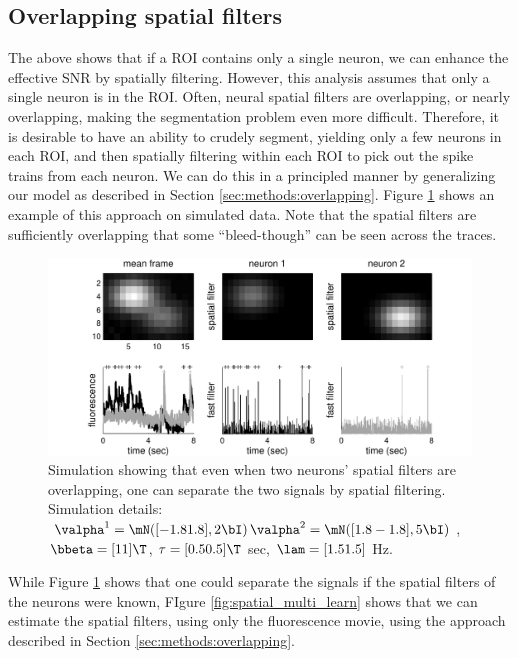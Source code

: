 \subsection{Overlapping spatial filters}


The above shows that if a ROI contains only a single neuron, we can enhance the effective SNR by spatially filtering.  However, this analysis assumes that only a single neuron is in the ROI.  Often, neural spatial filters are overlapping, or nearly overlapping, making the segmentation problem even more difficult.  Therefore, it is desirable to have an ability to crudely segment, yielding only a few neurons in each ROI, and then spatially filtering within each ROI to pick out the spike trains from each neuron.  We can do this in a principled manner by generalizing our model as described in Section \ref{sec:methods:overlapping}.  Figure \ref{fig:spatial_multi_inf} shows an example of this approach on simulated data. Note that the spatial filters are sufficiently overlapping that some ``bleed-though'' can be seen across the traces.  


\begin{figure}[h!]
\centering \includegraphics[width=.9\linewidth]{../figs/spatial_multi_inf}
\caption{Simulation showing that even when two neurons' spatial filters are overlapping, one can separate the two signals by spatial filtering. Simulation details: $\valpha^1=\mN([-1.8 1.8],2 \bI)\, \valpha^2=\mN([1.8 -1.8],5 \bI)$, $\bbeta=[1 1]\T$, $\tau=[0.5 0.5]\T$ sec, $\lam=[1.5 1.5]$ Hz.} \label{fig:spatial_multi_inf}
\end{figure}

While Figure \ref{fig:spatial_multi_inf} shows that one could separate the signals if the spatial filters of the neurons were known, FIgure \ref{fig:spatial_multi_learn} shows that we can estimate the spatial filters, using only the fluorescence movie, using the approach described in Section \ref{sec:methods:overlapping}.


